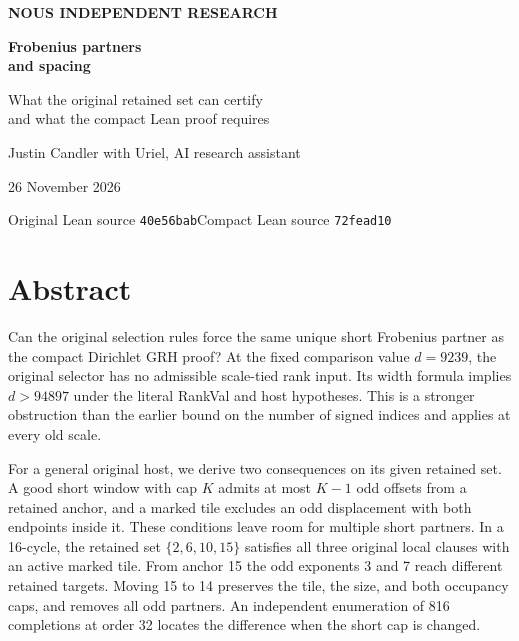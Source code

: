 \documentclass[12pt,letterpaper]{article}
\DeclareRobustCommand{\id}[1]{\mbox{\small\ttfamily #1}}
\begin{document}
\thispagestyle{empty}
\begin{center}
\vspace*{.52in}
{\sffamily\small\bfseries\color{accent}NOUS INDEPENDENT RESEARCH}\par\vspace{.65in}
{\fontsize{31}{37}\selectfont\bfseries\color{ink}Frobenius partners\\and spacing}\par\vspace{.27in}
{\Large What the original retained set can certify\\and what the compact Lean proof requires}\par\vspace{.35in}
\par\vspace{.47in}
{\large Justin Candler with Uriel, AI research assistant}\par
26 November 2026
\end{center}
\vfill
\begin{center}
\small\sffamily
Original Lean source \texttt{40e56bab}\quad\textbar\quad Compact Lean source \texttt{72fead10}
\end{center}
\clearpage
\section*{Abstract}

Can the original selection rules force the same unique short Frobenius partner as the compact Dirichlet GRH proof? At the fixed comparison value \(d=9239\), the original selector has no admissible scale-tied rank input. Its width formula implies \(d>94897\) under the literal \id{RankVal} and host hypotheses. This is a stronger obstruction than the earlier bound on the number of signed indices and applies at every old scale.

For a general original host, we derive two consequences on its given retained set. A good short window with cap \(K\) admits at most \(K-1\) odd offsets from a retained anchor, and a marked tile excludes an odd displacement with both endpoints inside it. These conditions leave room for multiple short partners. In a 16-cycle, the retained set \(\{2,6,10,15\}\) satisfies all three original local clauses with an active marked tile. From anchor 15 the odd exponents 3 and 7 reach different retained targets. Moving 15 to 14 preserves the tile, the size, and both occupancy caps, and removes all odd partners. An independent enumeration of 816 completions at order 32 locates the difference when the short cap is changed.
\end{document}
